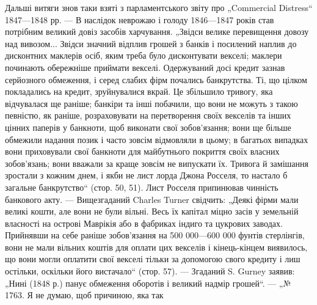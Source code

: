 Дальші витяги знов таки взяті з парламентського звіту про
„Commercial Distress“ 1847—1848 рр. — В наслідок неврожаю і голоду 1846—1847 років став потрібним
великий довіз засобів харчування. „Звідси велике перевищення довозу над вивозом... Звідси
значний відплив грошей з банків і посилений наплив до дисконтних маклерів осіб, яким треба було
дисконтувати векселі;
маклери починають обережніше приймати векселі. Одержуваний
досі кредит зазнав серйозного обмеження, і серед слабих фірм
почались банкрутства. Ті, що цілком покладались на кредит,
зруйнувалися вкрай. Це збільшило тривогу, яка відчувалася ще
раніше; банкіри та інші побачили, що вони не можуть з такою
певністю, як раніше, розраховувати на перетворення своїх векселів та інших цінних паперів у
банкноти, щоб виконати свої зобов’язання; вони ще більше обмежили надання позик і часто
зовсім відмовляли в цьому; в багатьох випадках вони приховували свої банкноти для майбутнього
покриття своїх власних зобов’язань; вони вважали за краще зовсім не випускати їх. Тривога
й замішання зростали з кожним днем, і якби не лист лорда
Джона Росселя, то настало б загальне банкрутство“ (стор. 50, 51).
Лист Росселя припинював чинність банкового акту. — Вищезгаданий Charles Turner свідчить: „Деякі
фірми мали великі кошти, але
вони не були вільні. Весь їх капітал міцно засів у земельній
власності на острові Маврікія або в фабриках індиго та цукрових заводах. Прийнявши на себе раніше
зобов’язання на 500 000—600 000 фунтів стерлінгів, вони не мали вільних коштів для
оплати цих векселів і кінець-кінцем виявилось, що вони могли
оплатити свої векселі тільки за допомогою свого кредиту і лиш
остільки, оскільки його вистачало“ (стор. 57). — Згаданий S. Gurney
заявив: „Нині (1848 р.) панує обмеження оборотів і великий
надмір грошей“. — „№ 1763. Я не думаю, щоб причиною, яка так
\parbreak{}  %
